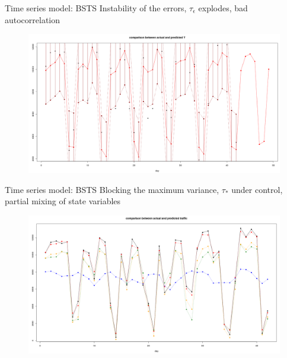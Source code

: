 \documentclass{beamer}
\begin{document}
\begin{frame}{Time series model: BSTS}
\alert{Instability} of the errors, $ \tau_\epsilon $ explodes, bad autocorrelation
\begin{figure}[H]
	\centering
	\includegraphics[width=1\linewidth]{pictures/erratic2.png} 
	\label{fig2}
\end{figure}

\end{frame}

\begin{frame}{Time series model: BSTS}
\alert{Blocking} the maximum variance, $ \tau_* $ under control, partial mixing of state variables
\begin{figure}[H]
	\centering
	\includegraphics[width=1\linewidth]{pictures/good.png} 
	\label{fig3}
\end{figure}
\end{frame}
\end{document}

